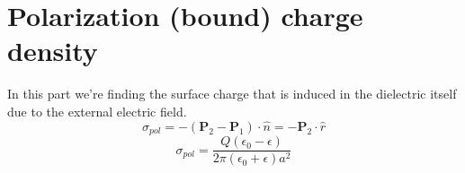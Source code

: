 \documentclass[10pt,a4paper]{article}
\begin{document}
\section{Polarization (bound) charge density}
In this part we're finding the surface charge that is induced in the dielectric itself due to the external electric field.
\begin{equation}
\sigma_{pol}=-(\mathbf{P}_2-\mathbf{P}_1)\cdot \hat{n}=-\mathbf{P}_2\cdot\hat{r}
\end{equation}
\begin{equation}\boxed{
\sigma_{pol}=\frac{Q(\epsilon_0-\epsilon)}{2\pi(\epsilon_0+\epsilon)a^2}
}\end{equation}
\end{document}
